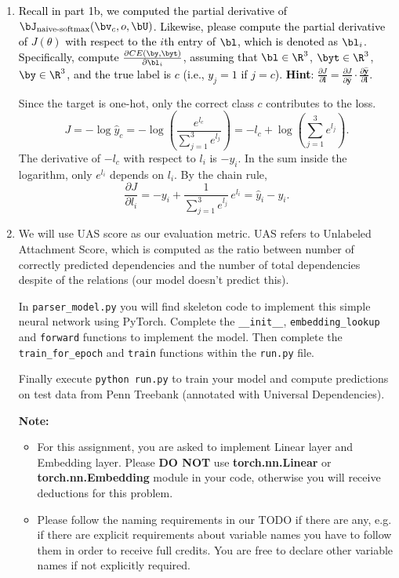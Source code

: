 \begin{parts}
\begin{enumerate}[label=\roman*.]
        \item \textcolor{black}{Recall in part 1b, we computed the partial derivative of $\bJ_{\text{naive-softmax}}(\bv_c, o, \bU)$. Likewise, please compute the partial derivative of $J(\theta)$ with respect to the $i$th entry of $\bl$, which is denoted as $\bl_i$. Specifically, compute $\frac{\partial CE(\by, \byt)}{\partial \bl_i}$, assuming that $\bl \in \R^3$, $\byt \in \R^3$, $\by \in \R^3$, and the true label is $c$ (i.e., $y_j=1$ if $j=c$).
        \textbf{Hint}:  $\frac{\partial J}{\partial \mathbf{l}} = \frac{\partial J}{\partial \hat{\mathbf{y}}} \cdot \frac{\partial \hat{\mathbf{y}}}{\partial \mathbf{l}}$.}
        \par\begin{answer}
        Since the target is one-hot, only the correct class $c$ contributes to the loss.
        \[
        J=-\log\hat y_c
          =-\log\left(\frac{e^{l_c}}{\sum_{j=1}^{3}e^{l_j}}\right)
          =-l_c+\log\left(\sum_{j=1}^{3}e^{l_j}\right).
        \]
        The derivative of $-l_c$ with respect to $l_i$ is $-y_i$.
        In the sum inside the logarithm, only $e^{l_i}$ depends on $l_i$.
        By the chain rule,
        \[
        \frac{\partial J}{\partial l_i}
        =-y_i+\frac{1}{\sum_{j=1}^{3}e^{l_j}}\,e^{l_i}
        =\hat y_i-y_i.
        \]
        \end{answer}

        \item We will use UAS score as our evaluation metric. UAS refers to Unlabeled Attachment Score, which is computed as the ratio between number of correctly predicted dependencies and the number of total dependencies despite of the relations (our model doesn't predict this).\newline
    
   In \texttt{parser\_model.py} you will find skeleton code to implement this simple neural network using PyTorch. Complete the \texttt{\_\_init\_\_}, \texttt{embedding\_lookup} and \texttt{forward} functions to implement the model. Then complete the \texttt{train\_for\_epoch} and \texttt{train} functions within the \texttt{run.py} file.
   
    Finally execute \texttt{python run.py} to train your model and compute predictions
    on test data from Penn Treebank (annotated with Universal Dependencies). 
    
    \textbf{Note:}
    \begin{itemize}
        \item For this assignment, you are asked to implement Linear layer and Embedding layer. Please \textbf{DO NOT} use \textbf{torch.nn.Linear} or  \textbf{torch.nn.Embedding} module in your code, otherwise you will receive deductions for this problem. 
        \item Please follow the naming requirements in our TODO if there are any, e.g. if there are explicit requirements about variable names you have to follow them in order to receive full credits. You are free to declare other variable names if not explicitly required. 
    \end{itemize}
    

\end{enumerate}
\end{parts}
